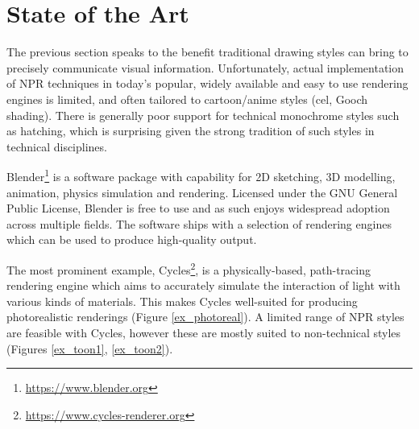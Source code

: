 \section{State of the Art}

The previous section speaks to the benefit traditional drawing styles can bring to precisely communicate visual information. Unfortunately, actual implementation of NPR techniques in today's popular, widely available and easy to use rendering engines is limited, and often tailored to cartoon/anime styles (cel, Gooch shading).
There is generally poor support for technical monochrome styles such as hatching, which is surprising given the strong tradition of such styles in technical disciplines.

Blender\footnote{\url{https://www.blender.org}} is a software package with capability for 2D sketching, 3D modelling, animation, physics simulation and rendering.
Licensed under the GNU General Public License, Blender is free to use and as such enjoys widespread adoption across multiple fields.
The software ships with a selection of rendering engines which can be used to produce high-quality output.

The most prominent example, Cycles\footnote{\url{https://www.cycles-renderer.org}}, is a physically-based, path-tracing rendering engine which aims to accurately simulate the interaction of light with various kinds of materials.
This makes Cycles well-suited for producing photorealistic renderings (Figure \ref{ex_photoreal}).
A limited range of NPR styles are feasible with Cycles, however these are mostly suited to non-technical styles (Figures \ref{ex_toon1}, \ref{ex_toon2}).

